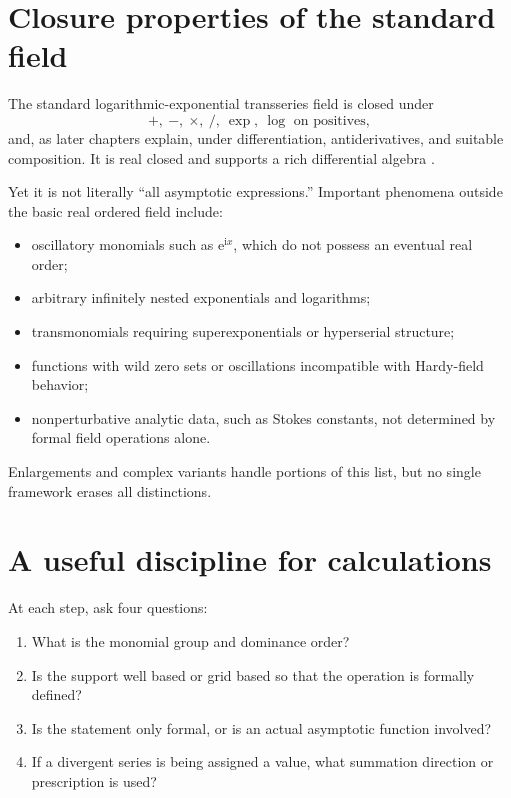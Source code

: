 \documentclass[11pt,openany]{book}
\theoremstyle{definition}
\theoremstyle{plain}
\theoremstyle{remark}
\newcommand{\e}{\mathrm{e}}
\newcommand{\ii}{\mathrm{i}}
\begin{document}
\section{Closure properties of the standard field}

The standard logarithmic-exponential transseries field is closed under
\[
 +,\ - ,\ \times,\ /,\ \exp,\ \log\text{ on positives},
\]
and, as later chapters explain, under differentiation, antiderivatives, and suitable composition. It is real closed and supports a rich differential algebra \cite{vdhoeven-book,adh-book}.

Yet it is not literally ``all asymptotic expressions.'' Important phenomena outside the basic real ordered field include:

\begin{itemize}
\item oscillatory monomials such as $\e^{\ii x}$, which do not possess an eventual real order;
\item arbitrary infinitely nested exponentials and logarithms;
\item transmonomials requiring superexponentials or hyperserial structure;
\item functions with wild zero sets or oscillations incompatible with Hardy-field behavior;
\item nonperturbative analytic data, such as Stokes constants, not determined by formal field operations alone.
\end{itemize}

Enlargements and complex variants handle portions of this list, but no single framework erases all distinctions.

\section{A useful discipline for calculations}

At each step, ask four questions:

\begin{enumerate}
\item What is the monomial group and dominance order?
\item Is the support well based or grid based so that the operation is formally defined?
\item Is the statement only formal, or is an actual asymptotic function involved?
\item If a divergent series is being assigned a value, what summation direction or prescription is used?
\end{enumerate}
\end{document}
